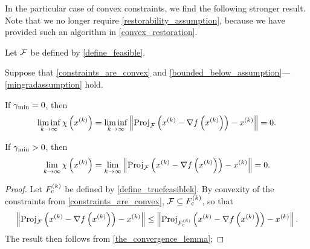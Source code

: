 In the particular case of convex constraints, we find the following stronger result.
Note that we no longer require \cref{restorability_assumption}, because we have provided such an algorithm in \cref{convex_restoration}.


\begin{corollary}
\label{the_convergence_theorem}

Let ${\mathcal F}$ be defined by \cref{define_feasible}.

% 

Suppose that \cref{constraints_are_convex} and \cref{bounded_below_assumption}---\cref{mingradassumption} hold.


If $\gamma_{\textrm{min}} = 0$, then
\begin{align*}
\liminf_{k\to\infty} \chi\left(x^{(k)}\right) = \liminf_{k\to\infty} \left\|{\textrm{Proj}}_{{\mathcal F}}\left(x^{(k)} - \nabla f\left(x^{(k)}\right)\right) - x^{(k)} \right\| = 0.
\end{align*}

If $\gamma_{\textrm{min}} > 0$, then
\begin{align*}
\lim_{k\to\infty} \chi\left(x^{(k)}\right) = \lim_{k\to\infty} \left\|{\textrm{Proj}}_{{\mathcal F}}\left(x^{(k)} - \nabla f\left(x^{(k)}\right)\right) - x^{(k)} \right\| = 0.
\end{align*}
\end{corollary}


\begin{proof}

Let ${F_c^{(k)}}$ be defined by \cref{define_truefeasiblek}.
By convexity of the constraints from \cref{constraints_are_convex}, ${\mathcal F} \subseteq {F_c^{(k)}}$, so that
\begin{align*}
\left\|{\textrm{Proj}}_{{\mathcal F}}\left(x^{(k)} - \nabla f\left(x^{(k)}\right)\right) - x^{(k)} \right\| 
\le \left\|{\textrm{Proj}}_{{F_c^{(k)}}}\left(x^{(k)} - \nabla f\left(x^{(k)}\right)\right) - x^{(k)} \right\|.
\end{align*}
The result then follows from \cref{the_convergence_lemma};

\end{proof}




